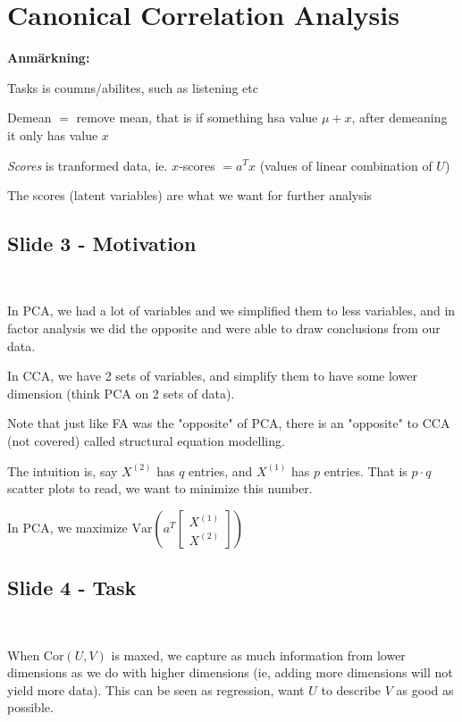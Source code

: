 \section{Canonical Correlation Analysis}
\noindent\textbf{Anmärkning:}\par
\noindent Tasks is coumns/abilites, such as listening etc
\par\bigskip
\noindent Demean $=$ remove mean, that is if something hsa value $\mu+x$, after demeaning it only has value $x$ 
\par\bigskip
\noindent \textit{Scores} is tranformed data, ie. $x$-scores $= a^Tx$ (values of linear combination of $U$)\par
\noindent The scores (latent variables) are what we want for further analysis
\subsection{Slide 3 - Motivation}\hfill\\\par
\noindent In PCA, we had a lot of variables and we simplified them to less variables, and in factor analysis we did the opposite and were able to draw conclusions from our data.
\par\bigskip
\noindent In CCA, we have 2 sets of variables, and simplify them to have some lower dimension (think PCA on 2 sets of data).
\par\bigskip
\noindent Note that just like FA was the "opposite" of PCA, there is an "opposite" to CCA (not covered) called structural equation modelling.
\par\bigskip
\noindent The intuition is, say $X^{(2)}$ has $q$ entries, and $X^{(1)}$ has $p$ entries. That is $p\cdot q$ scatter plots to read, we want to minimize this number.\par
\noindent In PCA, we maximize $\text{Var}\left(a^T\begin{bmatrix}X^{(1)}\\X^{(2)}\end{bmatrix}\right)$
\par\bigskip
\subsection{Slide 4 - Task}\hfill\\\par
\noindent When $\text{Cor}(U,V)$ is maxed, we capture as much information from lower dimensions as we do with higher dimensions (ie, adding more dimensions will not yield more data). This can be seen as regression, want $U$ to describe $V$ as good as possible.
\par\bigskip
